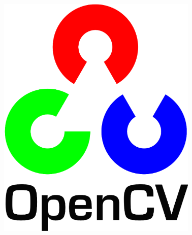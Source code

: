\begin{figure}
    \begin{center}    
        \includegraphics[width=0.5\linewidth]{images/image8.png}
    \end{center}
\end{figure}

